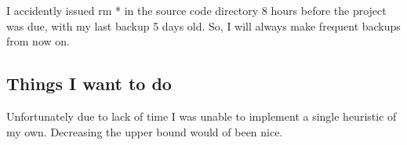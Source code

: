 I accidently issued rm * in the source code directory 8 hours before the
project was due, with my last backup 5 days old. So, I will always make
frequent backups from now on.

\subsection{Things I want to do}
Unfortunately due to lack of time I was unable to implement
a single heuristic of my own. Decreasing the upper bound would of been nice.
